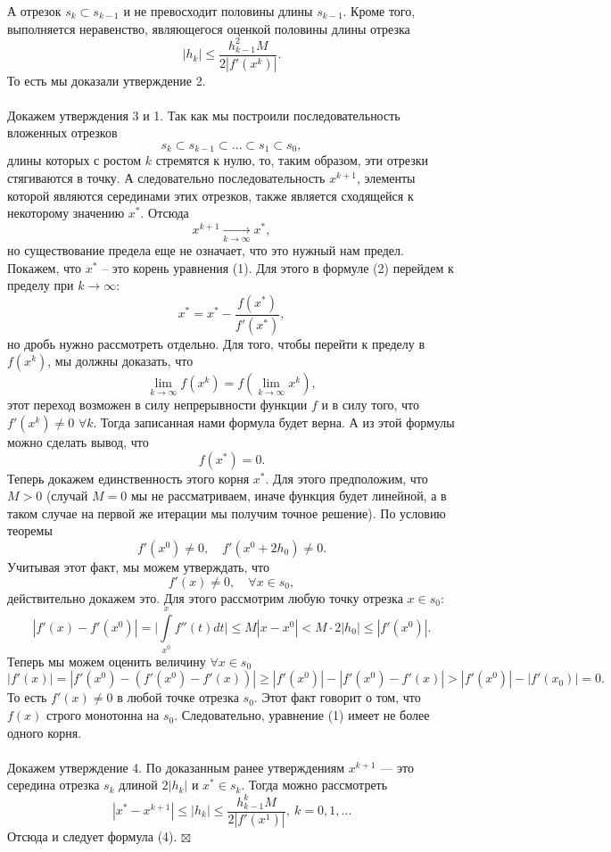 \documentclass[a4paper, 12pt]{report}
\newenvironment{Proof} %
{\par\noindent{$\blacklozenge$}} %
{\hfill$\scriptstyle\boxtimes$}
\renewcommand{\leq}{\leqslant}
\renewcommand{\geq}{\geqslant}
\begin{document}
\begin{Proof}
		А отрезок $s_k\subset s_{k-1}$ и не превосходит половины длины $s_{k-1}$. Кроме того, выполняется неравенство, являющегося оценкой половины длины отрезка $$|h_k| \leq \dfrac{h_{k-1}^2M}{2|f'(x^k)|}.$$
		То есть мы доказали утверждение 2.\\\\
		Докажем утверждения 3 и 1. Так как мы построили последовательность вложенных отрезков $$s_k \subset s_{k-1}\subset \ldots \subset s_1 \subset s_0,$$ длины которых с ростом $k$ стремятся к нулю, то, таким образом, эти отрезки стягиваются в точку. А следовательно последовательность $x^{k+1}$, элементы которой являются серединами этих отрезков, также является сходящейся к некоторому значению $x^*$. Отсюда $$x^{k+1}\xrightarrow[k\to\infty]{} x^*,$$
		но существование предела еще не означает, что это нужный нам предел. Покажем, что $x^*$ -- это корень уравнения (1). Для этого в формуле (2) перейдем к пределу при $k\to\infty$: $$x^* = x^* - \dfrac{f(x^*)}{f'(x^*)},$$ но дробь нужно рассмотреть отдельно. Для того, чтобы перейти к пределу в $f(x^k)$, мы должны доказать, что $$\lim\limits_{k\to\infty}f(x^k) = f(\lim\limits_{k\to\infty}x^k),$$
		этот переход возможен в силу непрерывности функции $f$ и в силу того, что $f'(x^k)\ne 0$ $\forall k$. Тогда записанная нами формула будет верна. А из этой формулы можно сделать вывод, что $$f(x^*) =0.$$
		Теперь докажем единственность этого корня $x^*$. Для этого предположим, что $M > 0$ (случай $M = 0$ мы не рассматриваем, иначе функция будет линейной, а в таком случае на первой же итерации мы получим точное решение). По условию теоремы $$f'(x^0) \ne 0,\quad f'(x^0 + 2h_0) \ne 0.$$
		Учитывая этот факт, мы можем утверждать, что $$f'(x) \ne 0,\quad \forall x \in s_0,$$
		действительно докажем это. Для этого рассмотрим любую точку отрезка $x \in s_0$: $$|f'(x) - f'(x^0)|  = \Big|\int\limits_{x^0}^x f''(t)dt\Big|\leq M|x-x^0| < M \cdot 2|h_0|\leq |f'(x^0)|.$$
		Теперь мы можем оценить величину $\forall x \in s_0$ $$|f'(x)| = |f'(x^0) - (f'(x^0) - f'(x))| \geq |f'(x^0)| - |f'(x^0) - f'(x)|>  |f'(x^0)| - |f'(x_0)| = 0.$$
		То есть $f'(x)\ne 0$ в любой точке отрезка $s_0$. Этот факт говорит о том, что $f(x)$ строго монотонна на $s_0$. Следовательно, уравнение (1) имеет не более одного корня.\\\\
		Докажем утверждение 4. По доказанным ранее утверждениям $x^{k+1}$ --- это середина отрезка $s_k$ длиной $2|h_k|$ и $x^* \in s_k$. Тогда можно рассмотреть $$|x^* - x^{k+1}| \leq |h_k|\leq \dfrac{h_{k-1}^k M}{2 |f'(x^1)|},\ k=0,1,\ldots$$
		Отсюда и следует формула (4).
	\end{Proof}\\\\
\end{document}
